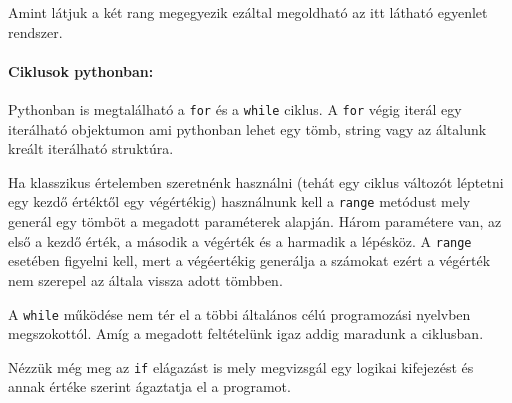 \begin{python}

\end{python}

   \begin{python}

\end{python}

    Amint látjuk a két rang megegyezik ezáltal megoldható az itt látható
egyenlet rendszer.

    \paragraph{Ciklusok pythonban:}\label{ciklusok-pythonban}

    Pythonban is megtalálható a \texttt{for} és a \texttt{while} ciklus. A
\texttt{for} végig iterál egy iterálható objektumon ami pythonban lehet
egy tömb, string vagy az általunk kreált iterálható struktúra.

\begin{python}

\end{python}

    Ha klasszikus értelemben szeretnénk használni (tehát egy ciklus változót
léptetni egy kezdő értéktől egy végértékig) használnunk kell a
\texttt{range} metódust mely generál egy tömböt a megadott paraméterek
alapján. Három paramétere van, az első a kezdő érték, a második a
végérték és a harmadik a lépésköz. A \texttt{range} esetében figyelni
kell, mert a végéertékig generálja a számokat ezért a végérték nem
szerepel az általa vissza adott tömbben.

   \begin{python}

\end{python}

    A \texttt{while} működése nem tér el a többi általános célú programozási
nyelvben megszokottól. Amíg a megadott feltételünk igaz addig maradunk a
ciklusban.

\begin{python}

\end{python}

\begin{python}

\end{python}

    Nézzük még meg az \texttt{if} elágazást is mely megvizsgál egy logikai
kifejezést és annak értéke szerint ágaztatja el a programot.

